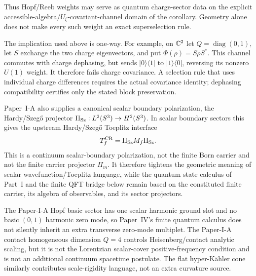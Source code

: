 \documentclass[12pt,a4paper]{article}
\begin{document}
Thus Hopf/Reeb weights may serve as quantum charge-sector data on the
explicit accessible-algebra/\(U_\xi\)-covariant-channel domain of the
corollary.
Geometry alone does not make every such weight an exact superselection rule.

\begin{remark}
\label{p4:rem:dephasing-not-charge-covariance}
The implication used above is one-way.  For example, on \(\mathbb{C}^2\) let
\(Q=\operatorname{diag}(0,1)\), let \(S\) exchange the two charge
eigenvectors, and put \(\Phi(\rho)=S\rho S^*\).  This channel commutes
with charge dephasing, but sends \(\lvert0\rangle\langle1\rvert\) to
\(\lvert1\rangle\langle0\rvert\), reversing its nonzero \(U(1)\)
weight.  It therefore fails charge covariance.  A selection rule that uses
individual charge differences requires the actual covariance identity;
dephasing compatibility certifies only the stated block preservation.
\end{remark}

\begin{remark}
\label{p4:rem:szego-polarization-interface}
Paper~I-A also supplies a canonical scalar boundary polarization, the Hardy/Szeg\H{o}
projector \(\Pi_{\rm Sz}:L^2(S^3)\to H^2(S^3)\).  In scalar boundary sectors
this gives the upstream Hardy/Szeg\H{o} Toeplitz interface
\[
T_f^{\rm CR}=\Pi_{\rm Sz}M_f\Pi_{\rm Sz}.
\]
This is a continuum scalar-boundary polarization, not the finite Born carrier and
not the finite carrier projector \(\Pi_m\).  It therefore tightens the geometric
meaning of scalar wavefunction/Toeplitz language, while the quantum state calculus
of Part~I and the finite QFT bridge below remain based on the constituted finite
carrier, its algebra of observables, and its sector projectors.
\end{remark}

\begin{remark}
\label{p4:rem:basic-contact-analytic-scope}
The Paper-I-A Hopf basic sector has one scalar harmonic ground slot and no basic
\((0,1)\) harmonic zero mode, so Paper~IV's finite quantum calculus does not
silently inherit an extra transverse zero-mode multiplet.  The Paper-I-A contact
homogeneous dimension \(Q=4\) controls Heisenberg/contact analytic scaling, but it
is not the Lorentzian scalar-cover positive-frequency condition and is not an
additional continuum spacetime postulate.  The flat hyper-K\"ahler cone similarly
contributes scale-rigidity language, not an extra curvature source.
\end{remark}
\end{document}
